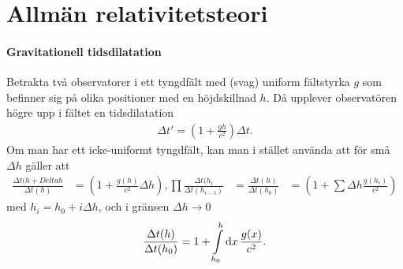 \section{Allmän relativitetsteori}

\paragraph{Gravitationell tidsdilatation}
Betrakta två observatorer i ett tyngdfält med (svag) uniform fältstyrka $g$ som befinner sig på olika positioner med en höjdskillnad $h$. Då upplever observatören högre upp i fältet en tidsdilatation
\begin{align*}
	\Delta t' = (1 + \frac{gh}{c^{2}})\Delta t.
\end{align*}
Om man har ett icke-uniformt tyngdfält, kan man i stället använda att för små $\Delta h$ gäller att
\begin{align*}
	\frac{\Delta t(h + Delta{h}}{\Delta t(h)}       &= (1 + \frac{g(h)}{c^{2}}\Delta{h}),
	\prod\frac{\Delta t(h_{i}}{\Delta t(h_{i - 1})} &= \frac{\Delta t(h)}{\Delta t(h_{0})} &= (1 + \sum\Delta{h}\frac{g(h_{i})}{c^{2}})
\end{align*}
med $h_{i} = h_{0} + i\Delta{h}$, och i gränsen $\Delta h\to 0$
\begin{align*}
	\frac{\Delta t(h)}{\Delta t(h_{0})} = 1 + \int\limits_{h_{0}}^{h}\dd{x}\frac{g(x)}{c^{2}}.
\end{align*}
